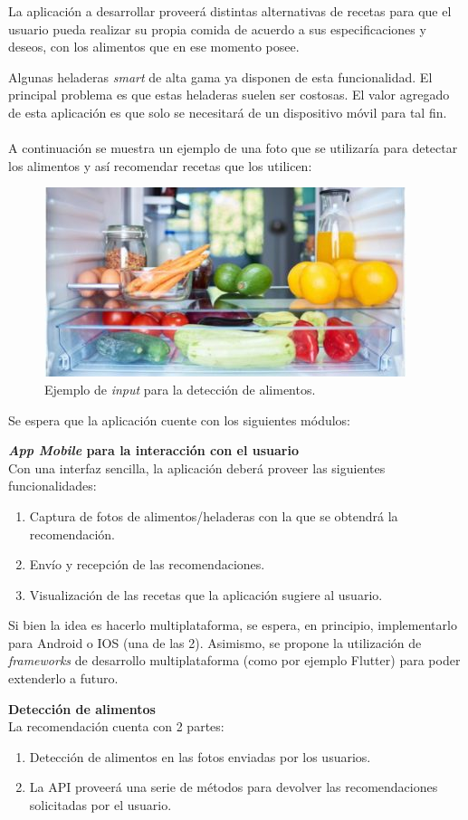 \documentclass[
11pt, %
]{charter}
\begin{document}
La aplicación a desarrollar proveerá distintas alternativas de recetas para que el usuario pueda realizar su propia comida de acuerdo a sus especificaciones y deseos, con los alimentos que en ese momento posee.


Algunas heladeras \textit{smart} de alta gama ya disponen de esta funcionalidad. El principal problema es que estas heladeras suelen ser costosas. El valor agregado de esta aplicación es que solo se necesitará de un dispositivo móvil para tal fin.  \\ \\
A continuación se muestra un ejemplo de una foto que se utilizaría para detectar los alimentos y así recomendar recetas que los utilicen:
\label{sec:HeladeraEjemplo}


\begin{figure}[H]
\centering 
\includegraphics[width=.4\textwidth]{./heladera.jpg}
\caption{Ejemplo de \textit{input} para la detección de alimentos.}
\label{fig:HeladeraEjemplo}
\end{figure}


Se espera que la aplicación cuente con los siguientes módulos: 

\textbf{\textit{App Mobile} para la interacción con el usuario}\\
Con una interfaz sencilla, la aplicación deberá proveer las siguientes funcionalidades:
\begin{enumerate}
\item Captura de fotos de alimentos/heladeras con la que se obtendrá la recomendación.
\item Envío y recepción de las recomendaciones.
\item Visualización de las recetas que la aplicación sugiere al usuario.
\end{enumerate}

Si bien la idea es hacerlo multiplataforma, se espera, en principio, implementarlo para Android o IOS (una de las 2). Asimismo, se propone la utilización de \textit{frameworks} de desarrollo multiplataforma (como por ejemplo Flutter) para poder extenderlo a futuro.
  
\textbf{Detección de alimentos}\\
La recomendación cuenta con 2 partes:
\begin{enumerate}
\item Detección de alimentos en las fotos enviadas por los usuarios.
\item  La API proveerá una serie de métodos para devolver las recomendaciones solicitadas por el usuario.
\end{enumerate}
\end{document}
